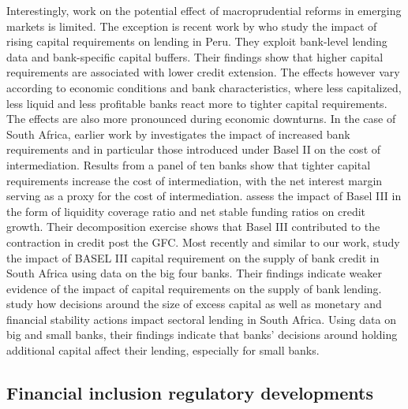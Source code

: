 \documentclass[
  letterpaper,
  DIV=11,
  numbers=noendperiod]{scrartcl}
\begin{document}
Interestingly, work on the potential effect of macroprudential reforms
in emerging markets is limited. The exception is recent work by
\cite{fang2022bank} who study the impact of rising capital requirements
on lending in Peru. They exploit bank-level lending data and
bank-specific capital buffers. Their findings show that higher capital
requirements are associated with lower credit extension. The effects
however vary according to economic conditions and bank characteristics,
where less capitalized, less liquid and less profitable banks react more
to tighter capital requirements. The effects are also more pronounced
during economic downturns. In the case of South Africa, earlier work by
\cite{maredza2016capital} investigates the impact of increased bank
requirements and in particular those introduced under Basel II on the
cost of intermediation. Results from a panel of ten banks show that
tighter capital requirements increase the cost of intermediation, with
the net interest margin serving as a proxy for the cost of
intermediation. \cite{gumata2017bank} assess the impact of Basel III in
the form of liquidity coverage ratio and net stable funding ratios on
credit growth. Their decomposition exercise shows that Basel III
contributed to the contraction in credit post the GFC. Most recently and
similar to our work, \cite{sibande2024} study the impact of BASEL III
capital requirement on the supply of bank credit in South Africa using
data on the big four banks. Their findings indicate weaker evidence of
the impact of capital requirements on the supply of bank lending.
\cite{makrelov2024lending} study how decisions around the size of excess
capital as well as monetary and financial stability actions impact
sectoral lending in South Africa. Using data on big and small banks,
their findings indicate that banks' decisions around holding additional
capital affect their lending, especially for small banks.

\subsection{Financial inclusion regulatory
developments}\label{financial-inclusion-regulatory-developments}
\end{document}
